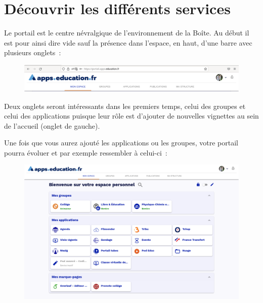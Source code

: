 \chapter*{Découvrir les différents services}

Le portail est le centre névralgique de l'environnement de la Boîte. 
Au début il est pour ainsi dire vide sauf la présence dans l'espace, en haut, d'une barre avec plusieurs onglets~:
\begin{figure}
	\centering
	\includegraphics[width=\linewidth]{./Captures/portail.barre.haute.png}
\end{figure}
Deux onglets seront intéressants dans les premiers temps, celui des groupes et celui des applications puisque leur rôle est d'ajouter de nouvelles vignettes au sein de l'accueil (onglet de gauche).

Une fois que vous aurez ajouté les applications ou les groupes, votre portail pourra évoluer et par exemple ressembler à celui-ci~:
\begin{figure}
	\centering
	\includegraphics[width=\linewidth]{./Captures/portail.accueil.png}
\end{figure}


